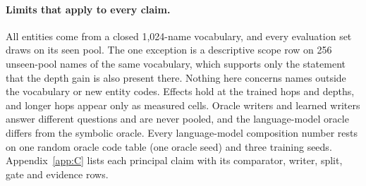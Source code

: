 \paragraph{Limits that apply to every claim.}
All entities come from a closed 1,024-name vocabulary, and every evaluation set draws on its seen pool.
The one exception is a descriptive scope row on 256 unseen-pool names of the same vocabulary, which supports only the statement that the depth gain is also present there.  %
Nothing here concerns names outside the vocabulary or new entity codes.
Effects hold at the trained hops and depths, and longer hops appear only as measured cells.
Oracle writers and learned writers answer different questions and are never pooled, and the language-model oracle differs from the symbolic oracle.  %
Every language-model composition number rests on one random oracle code table (one oracle seed) and three training seeds.  %
Appendix~\ref{app:C} lists each principal claim with its comparator, writer, split, gate and evidence rows.
